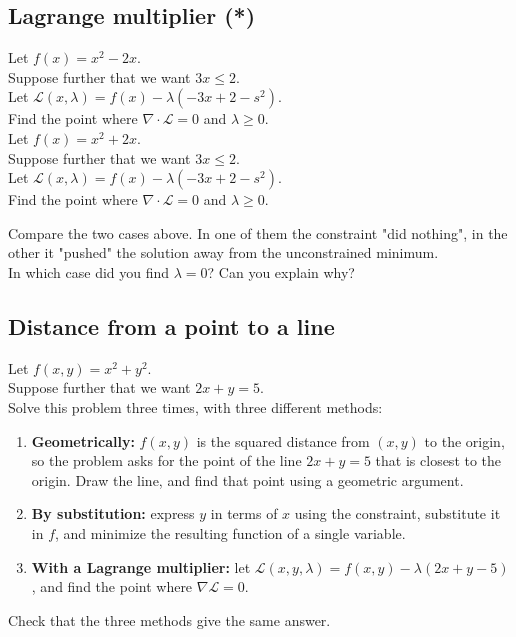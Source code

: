 \documentclass[]{article}
\begin{document}
	\subsection{Lagrange multiplier (*)}
	Let $f(x) = x^2-2x$.\\
	Suppose further that we want $3x \leq 2$.\\
	Let $\mathcal{L}(x,\lambda) = f(x) - \lambda (-3x + 2 - s^2)$.\\
	Find the point where $\nabla \cdot \mathcal{L} = 0$ and $\lambda \geq 0$.
	\vspace{0.5cm}
	\\
	Let $f(x) = x^2+2x$.\\
	Suppose further that we want $3x \leq 2$.\\
	Let $\mathcal{L}(x,\lambda) = f(x) - \lambda (-3x + 2 - s^2)$.\\
	Find the point where $\nabla \cdot \mathcal{L} = 0$ and $\lambda \geq 0$.

	\vspace{0.5cm}

	Compare the two cases above.
	In one of them the constraint "did nothing", in the other it "pushed" the solution away from the unconstrained minimum.\\
	In which case did you find $\lambda = 0$?
	Can you explain why?


	\subsection{Distance from a point to a line}
	Let $f(x,y) = x^2 + y^2$.\\
	Suppose further that we want $2x + y = 5$.\\
	Solve this problem three times, with three different methods:
	\begin{enumerate}
		\item \textbf{Geometrically:} $f(x,y)$ is the squared distance from $(x,y)$ to the origin, so the problem asks for the point of the line $2x+y=5$ that is closest to the origin.
		Draw the line, and find that point using a geometric argument.
		\item \textbf{By substitution:} express $y$ in terms of $x$ using the constraint, substitute it in $f$, and minimize the resulting function of a single variable.
		\item \textbf{With a Lagrange multiplier:} let $\mathcal{L}(x,y,\lambda) = f(x,y) - \lambda(2x + y - 5)$, and find the point where $\nabla \mathcal{L} = 0$.
	\end{enumerate}
	Check that the three methods give the same answer.
\end{document}
